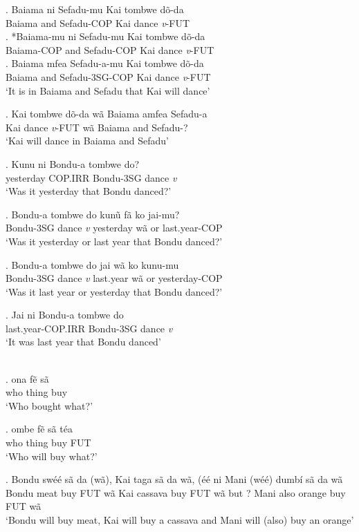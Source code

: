 \documentclass{assets/fieldnotes}
\begin{document}
\exg. Baiama ni Sefadu-mu Kai tombwe dõ-da\\
Baiama and Sefadu-COP Kai dance \textit{v}-FUT\\

\exg. *Baiama-mu ni Sefadu-mu Kai tombwe dõ-da\\
Baiama-COP and Sefadu-COP Kai dance \textit{v}-FUT\\

\exg. Baiama mfea Sefadu-a-mu Kai tombwe dõ-da\\
Baiama and Sefadu-3SG-COP Kai dance \textit{v}-FUT\\
`It is in Baiama and Sefadu that Kai will dance'

\exg. Kai tombwe dõ-da wã Baiama amfea Sefadu-a\\
Kai dance \textit{v}-FUT wã Baiama and Sefadu-?\\
`Kai will dance in Baiama and Sefadu'

\exg. Kunu ni Bondu-a tombwe do?\\
yesterday COP.IRR Bondu-3SG dance \textit{v}\\
`Was it yesterday that Bondu danced?'

\exg. Bondu-a tombwe do kunũ fã ko jai-mu?\\
Bondu-3SG dance \textit{v} yesterday wã or last.year-COP\\
`Was it yesterday or last year that Bondu danced?'

\exg. Bondu-a tombwe do jai wã ko kunu-mu\\
Bondu-3SG dance \textit{v} last.year wã or yesterday-COP\\
`Was it last year or yesterday that Bondu danced?'

\exg. Jai ni Bondu-a tombwe do\\
last.year-COP.IRR Bondu-3SG dance \textit{v}\\
`It was last year that Bondu danced'

\\

\exg. \textipa{\textltailn}ona fẽ sã\\
who thing buy\\
`Who bought what?'

\exg. \textipa{\textltailn}ombe fẽ sã téa\\
who thing buy FUT\\
`Who will buy what?'

\exg. Bondu swéé sã da (wã), Kai taga sã da wã, (éé ni Mani (wéé) dumbí sã da wã\\
Bondu meat buy FUT wã Kai cassava buy FUT wã but ? Mani also orange buy FUT wã\\
`Bondu will buy meat, Kai will buy a cassava and Mani will (also) buy an orange'
\end{document}
